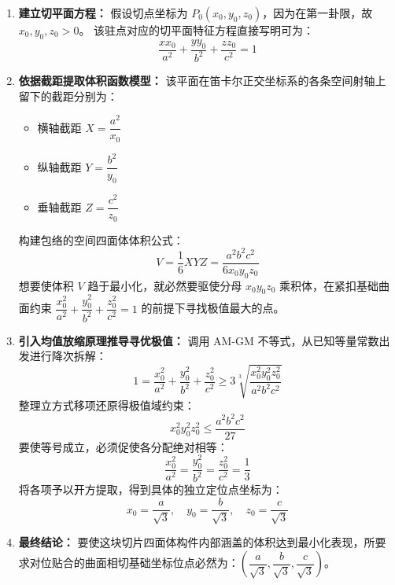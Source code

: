 \documentclass[lang=cn,11pt]{elegantbook}
\begin{document}
\begin{solution}
\begin{enumerate}
    \item \textbf{建立切平面方程：}
    假设切点坐标为 $P_0(x_0, y_0, z_0)$，因为在第一卦限，故 $x_0, y_0, z_0 > 0$。
    该驻点对应的切平面特征方程直接写明可为：
    \[
    \frac{xx_0}{a^2} + \frac{yy_0}{b^2} + \frac{zz_0}{c^2} = 1
    \]

    \item \textbf{依据截距提取体积函数模型：}
    该平面在笛卡尔正交坐标系的各条空间射轴上留下的截距分别为：
    \begin{itemize}
        \item 横轴截距 $X = \dfrac{a^2}{x_0}$
        \item 纵轴截距 $Y = \dfrac{b^2}{y_0}$
        \item 垂轴截距 $Z = \dfrac{c^2}{z_0}$
    \end{itemize}
    构建包络的空间四面体体积公式：
    \[
    V = \frac{1}{6} XYZ = \frac{a^2 b^2 c^2}{6 x_0 y_0 z_0}
    \]
    想要使体积 $V$ 趋于最小化，就必然要驱使分母 $x_0 y_0 z_0$ 乘积体，在紧扣基础曲面约束 $\dfrac{x_0^2}{a^2}+\dfrac{y_0^2}{b^2}+\dfrac{z_0^2}{c^2}=1$ 的前提下寻找极值最大的点。

    \item \textbf{引入均值放缩原理推导寻优极值：}
    调用 AM-GM 不等式，从已知等量常数出发进行降次拆解：
    \[
    1 = \frac{x_0^2}{a^2} + \frac{y_0^2}{b^2} + \frac{z_0^2}{c^2} \ge 3 \sqrt[3]{\frac{x_0^2 y_0^2 z_0^2}{a^2 b^2 c^2}}
    \]
    整理立方式移项还原得极值域约束：
    \[
    x_0^2 y_0^2 z_0^2 \le \frac{a^2 b^2 c^2}{27}
    \]
    要使等号成立，必须促使各分配绝对相等：
    \[
    \frac{x_0^2}{a^2} = \frac{y_0^2}{b^2} = \frac{z_0^2}{c^2} = \frac{1}{3}
    \]
    将各项予以开方提取，得到具体的独立定位点坐标为：
    \[
    x_0 = \frac{a}{\sqrt{3}}, \quad y_0 = \frac{b}{\sqrt{3}}, \quad z_0 = \frac{c}{\sqrt{3}}
    \]
        
    \item \textbf{最终结论：}
    要使这块切片四面体构件内部涵盖的体积达到最小化表现，所要求对位贴合的曲面相切基础坐标位点必然为：\textbf{$\left( \dfrac{a}{\sqrt{3}}, \dfrac{b}{\sqrt{3}}, \dfrac{c}{\sqrt{3}} \right)$}。
\end{enumerate}
\end{solution}


\end{document}
